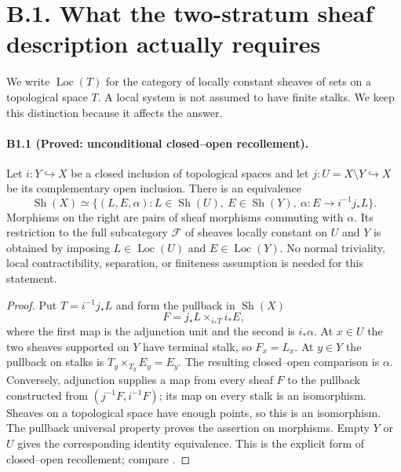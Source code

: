 
\section{B.1. What the two-stratum sheaf description actually requires}

We write $\operatorname{Loc}(T)$ for the category of locally constant sheaves
of sets on a topological space $T$. A local system is not assumed to have
finite stalks. We keep this distinction because it affects the answer.

\paragraph{B1.1 (Proved: unconditional closed--open recollement).}
Let $i:Y\hookrightarrow X$ be a closed inclusion of topological spaces and
let $j:U=X\setminus Y\hookrightarrow X$ be its complementary open inclusion.
There is an equivalence
\[
 \operatorname{Sh}(X)\simeq
 \{(L,E,\alpha):L\in\operatorname{Sh}(U),\ E\in\operatorname{Sh}(Y),\
             \alpha:E\longrightarrow i^{-1}j_*L\}.
 \tag{B1.1}
\]
Morphisms on the right are pairs of sheaf morphisms commuting with $\alpha$.
Its restriction to the full subcategory $\mathcal F$ of sheaves locally
constant on $U$ and $Y$ is obtained by imposing
$L\in\operatorname{Loc}(U)$ and $E\in\operatorname{Loc}(Y)$. No normal
triviality, local contractibility, separation, or finiteness assumption is
needed for this statement.

\begin{proof}
Put $T=i^{-1}j_*L$ and form the pullback in $\operatorname{Sh}(X)$
\[
 F=j_*L\mathbin{\times}_{i_*T}i_*E,
 \tag{B1.2}
\]
where the first map is the adjunction unit and the second is $i_*\alpha$.
At $x\in U$ the two sheaves supported on $Y$ have terminal stalk, so
$F_x=L_x$. At $y\in Y$ the pullback on stalks is
$T_y\times_{T_y}E_y=E_y$. The resulting closed--open comparison is
$\alpha$. Conversely, adjunction supplies a map from every sheaf $F$ to
the pullback constructed from $(j^{-1}F,i^{-1}F)$; its map on every stalk
is an isomorphism. Sheaves on a topological space have enough points,
so this is an isomorphism. The pullback universal property proves the
assertion on morphisms. Empty $Y$ or $U$ gives the corresponding identity
equivalence. This is the explicit form of closed--open recollement; compare
\cite[Example A.8.4]{LurieHA}.
\end{proof}

